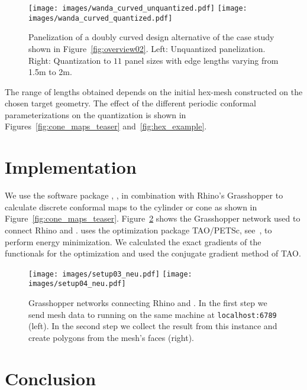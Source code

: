 \documentclass[Thesis.tex]{subfiles}
\begin{document}
\begin{figure}[tbp]
  \centering
  \texttt{[image: images/wanda\_curved\_unquantized.pdf]}
  \texttt{[image: images/wanda\_curved\_quantized.pdf]}
  \caption{Panelization of a doubly curved design alternative of the
    case study shown in Figure~\ref{fig:overview02}. Left: Unquantized
    panelization.  Right: Quantization to $11$ panel sizes with edge
    lengths varying from 1.5m to 2m.}
  \label{fig:quantization}
\end{figure}

The range of lengths obtained depends on the initial hex-mesh
constructed on the chosen target geometry. The effect of the
different periodic conformal parameterizations on the quantization is
shown in Figures~\ref{fig:cone_maps_teaser} and~\ref{fig:hex_example}.


\section{Implementation}
\label{sec:implementation}

We use the software package \VaryLab, \cite{varylab-web-page}, in
combination with Rhino's Grasshopper to calculate discrete conformal
maps to the cylinder or cone as shown in Figure~\ref{fig:cone_maps_teaser}.
Figure~\ref{fig:grasshopper} shows the Grasshopper network used to
connect Rhino and \VaryLab.
\VaryLab uses the optimization package {\sc TAO/PETSc}, see~\cite{tao-user-ref, 
petsc-web-page, jpetsctao-web-page}, to perform energy
minimization.
%
We calculated the exact gradients of the functionals for the
optimization and used the conjugate gradient method of {\sc TAO}.

\begin{figure}[tb]
	\texttt{[image: images/setup03\_neu.pdf]}
	\hspace{0.06\textwidth}
	\texttt{[image: images/setup04\_neu.pdf]}
	\caption{Grasshopper networks connecting Rhino and
          \VaryLab{}. In the first step we send mesh data to \VaryLab{}
          running on the same machine at {\tt localhost:6789}
          (left). In the second step we collect the result from this
          \VaryLab{} instance and create polygons from the mesh's
          faces (right).}
	\label{fig:grasshopper}
\end{figure}


\section{Conclusion}
\label{sec:conclusion}
\end{document}
